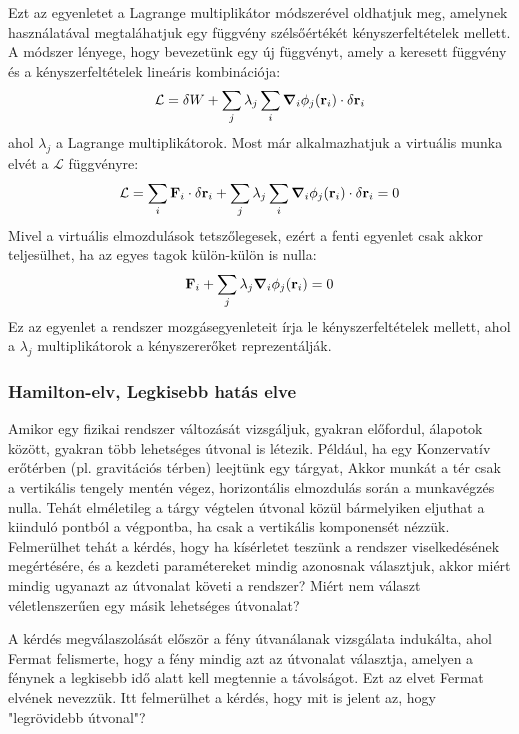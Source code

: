 \documentclass[a4paper,12pt]{article}
\begin{document}
Ezt az egyenletet a Lagrange multiplikátor módszerével oldhatjuk meg, amelynek használatával megtaláhatjuk egy függvény szélsőértékét kényszerfeltételek mellett. A módszer lényege, hogy bevezetünk egy új függvényt, amely a keresett függvény és a kényszerfeltételek lineáris kombinációja:
\begin{equation}
    \mathcal{L} = \delta W + \sum_j \lambda_j \sum_i \boldsymbol{\nabla}_i \phi_j(\bold{r}_i) \cdot \delta \bold{r}_i
\end{equation}
ahol $\lambda_j$ a Lagrange multiplikátorok. Most már alkalmazhatjuk a virtuális munka elvét a $\mathcal{L}$ függvényre:
\begin{equation}
    \mathcal{L} = \sum_i \bold{F}_i \cdot \delta \bold{r}_i + \sum_j \lambda_j \sum_i \boldsymbol{\nabla}_i \phi_j(\bold{r}_i) \cdot \delta \bold{r}_i = 0
\end{equation}
Mivel a virtuális elmozdulások tetszőlegesek, ezért a fenti egyenlet csak akkor teljesülhet, ha az egyes tagok külön-külön is nulla:
\begin{equation}
    \bold{F}_i + \sum_j \lambda_j \boldsymbol{\nabla}_i \phi_j(\bold{r}_i) = 0
\end{equation}
Ez az egyenlet a rendszer mozgásegyenleteit írja le kényszerfeltételek mellett, ahol a $\lambda_j$ multiplikátorok a kényszererőket reprezentálják.

\subsubsection{Hamilton-elv, Legkisebb hatás elve}
Amikor egy fizikai rendszer változását vizsgáljuk, gyakran előfordul, álapotok között, gyakran több lehetséges útvonal is létezik. Például, ha egy Konzervatív erőtérben (pl. gravitációs térben) leejtünk egy tárgyat,
Akkor munkát a tér csak a vertikális tengely mentén végez, horizontális elmozdulás során a munkavégzés nulla. Tehát elméletileg a tárgy végtelen útvonal közül bármelyiken eljuthat a kiinduló pontból a végpontba, ha csak a vertikális komponensét nézzük.
Felmerülhet tehát a kérdés, hogy ha kísérletet teszünk a rendszer viselkedésének megértésére, és a kezdeti paramétereket mindig azonosnak választjuk, akkor miért mindig ugyanazt az útvonalat követi a rendszer? Miért nem választ véletlenszerűen egy másik lehetséges útvonalat?

A kérdés megválaszolását először a fény útvanálanak vizsgálata indukálta, ahol Fermat felismerte, hogy a fény mindig azt az útvonalat választja, amelyen a fénynek a legkisebb idő alatt kell megtennie a távolságot. Ezt az elvet Fermat elvének nevezzük.
Itt felmerülhet a kérdés, hogy mit is jelent az, hogy "legrövidebb útvonal"? 
\end{document}
